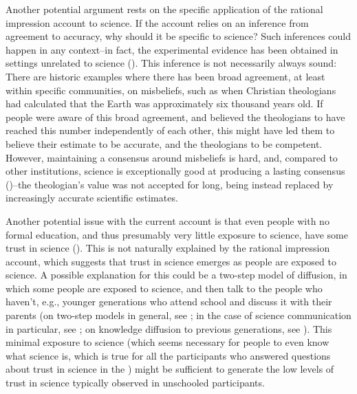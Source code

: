 \documentclass[
  man,
  floatsintext,
  longtable,
  nolmodern,
  notxfonts,
  notimes,
  colorlinks=true,linkcolor=blue,citecolor=blue,urlcolor=blue]{apa7}
\begin{document}
Another potential argument rests on the specific application of the
rational impression account to science. If the account relies on an
inference from agreement to accuracy, why should it be specific to
science? Such inferences could happen in any context--in fact, the
experimental evidence has been obtained in settings unrelated to science
(). This inference is not necessarily always sound: There are
historic examples where there has been broad agreement, at least within
specific communities, on misbeliefs, such as when Christian theologians
had calculated that the Earth was approximately six thousand years old.
If people were aware of this broad agreement, and believed the
theologians to have reached this number independently of each other,
this might have led them to believe their estimate to be accurate, and
the theologians to be competent. However, maintaining a consensus around
misbeliefs is hard, and, compared to other institutions, science is
exceptionally good at producing a lasting consensus
()--the theologian's value was not accepted for long, being instead
replaced by increasingly accurate scientific estimates.

Another potential issue with the current account is that even people
with no formal education, and thus presumably very little exposure to
science, have some trust in science
(). This is not naturally explained by the rational
impression account, which suggests that trust in science emerges as
people are exposed to science. A possible explanation for this could be
a two-step model of diffusion, in which some people are exposed to
science, and then talk to the people who haven't, e.g., younger
generations who attend school and discuss it with their parents (on
two-step models in general, see
; in the case
of science communication in particular, see
;
on knowledge diffusion to previous generations, see
). This minimal exposure to science (which seems necessary for
people to even know what science is, which is true for all the
participants who answered questions about trust in science in the
) might be sufficient to generate the low levels of
trust in science typically observed in unschooled participants.
\end{document}
